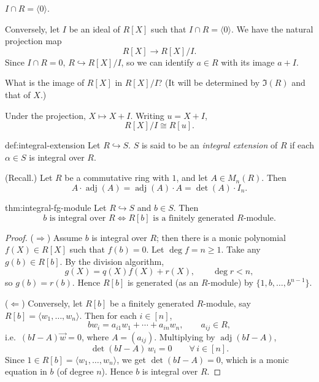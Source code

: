 \begin{notation}
$I \cap R = \langle 0 \rangle$.
\end{notation}

Conversely, let $I$ be an ideal of $R[X]$ such that $I \cap R = \langle 0 \rangle$. We have the natural projection map
\[
R[X] \longrightarrow R[X]/I.
\]
Since $I \cap R = 0$, $R \hookrightarrow R[X]/I$, so we can identify $a \in R$ with its image $a + I$.

\begin{question}
What is the image of $R[X]$ in $R[X]/I$? (It will be determined by $\Im(R)$ and that of $X$.)
\end{question}

Under the projection, $X \mapsto X+I$. Writing $u = X+I$,
\[
R[X]/I \cong R[u].
\]

\begin{definition}{}{def:integral-extension}
Let $R \hookrightarrow S$. $S$ is said to be an \emph{integral extension} of $R$ if each $\alpha \in S$ is integral over $R$.
\end{definition}

\begin{notation}
(Recall.) Let $R$ be a commutative ring with $1$, and let $A \in M_n(R)$. Then
\[
A \cdot \operatorname{adj}(A) = \operatorname{adj}(A) \cdot A = \det(A) \cdot I_n.
\]
\end{notation}

\begin{theorem}{}{thm:integral-fg-module}
Let $R \hookrightarrow S$ and $b \in S$. Then
\[
b \text{ is integral over } R \iff R[b] \text{ is a finitely generated } R\text{-module}.
\]
\end{theorem}

\begin{proof}
($\Rightarrow$) Assume $b$ is integral over $R$; then there is a monic polynomial $f(X) \in R[X]$ such that $f(b) = 0$. Let $\deg f = n \geq 1$. Take any $g(b) \in R[b]$. By the division algorithm,
\[
g(X) = q(X) f(X) + r(X), \qquad \deg r < n,
\]
so $g(b) = r(b)$. Hence $R[b]$ is generated (as an $R$-module) by $\{1, b, \ldots, b^{n-1}\}$.

($\Leftarrow$) Conversely, let $R[b]$ be a finitely generated $R$-module, say $R[b] = \langle w_1, \ldots, w_n \rangle$. Then for each $i \in [n]$,
\[
b w_i = a_{i1} w_1 + \cdots + a_{in} w_n, \qquad a_{ij} \in R,
\]
i.e.\ $(bI - A)\vec{w} = 0$, where $A = (a_{ij})$. Multiplying by $\operatorname{adj}(bI-A)$,
\[
\det(bI-A)\, w_i = 0 \qquad \forall\, i \in [n].
\]
Since $1 \in R[b] = \langle w_1, \ldots, w_n \rangle$, we get $\det(bI-A) = 0$, which is a monic equation in $b$ (of degree $n$). Hence $b$ is integral over $R$.
\end{proof}

